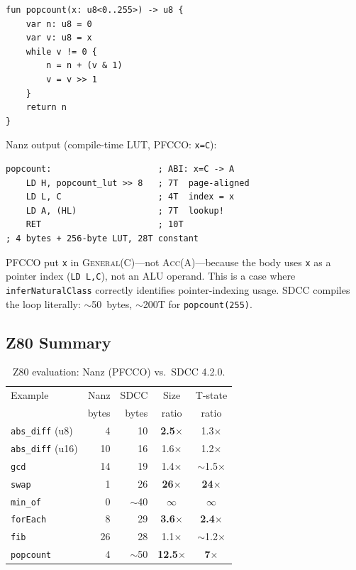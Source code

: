 \documentclass[sigplan,screen,nonacm]{acmart}
\begin{document}
\begin{lstlisting}[language=nanz,caption={Popcount with range annotation.}]
fun popcount(x: u8<0..255>) -> u8 {
    var n: u8 = 0
    var v: u8 = x
    while v != 0 {
        n = n + (v & 1)
        v = v >> 1
    }
    return n
}
\end{lstlisting}

\noindent Nanz output (compile-time LUT, PFCCO: \texttt{x=C}):
\begin{lstlisting}[language=z80asm]
popcount:                     ; ABI: x=C -> A
    LD H, popcount_lut >> 8   ; 7T  page-aligned
    LD L, C                   ; 4T  index = x
    LD A, (HL)                ; 7T  lookup!
    RET                       ; 10T
; 4 bytes + 256-byte LUT, 28T constant
\end{lstlisting}

PFCCO put \texttt{x} in \textsc{General}(C)---not \textsc{Acc}(A)---because
the body uses \texttt{x} as a pointer index (\texttt{LD~L,C}), not an ALU
operand.  This is a case where \texttt{inferNaturalClass} correctly
identifies pointer-indexing usage.  SDCC compiles the loop literally: $\sim$50~bytes, $\sim$200T for \texttt{popcount(255)}.

\subsection{Z80 Summary}

\begin{table}[h]
\centering\small
\caption{Z80 evaluation: Nanz (PFCCO) vs.\ SDCC 4.2.0.}
\label{tab:z80summary}
\begin{tabular}{@{}lrrcc@{}}
\toprule
Example & Nanz & SDCC & Size & T-state \\
        & bytes & bytes & ratio & ratio \\
\midrule
\texttt{abs\_diff} (u8)  & 4  & 10 & \textbf{2.5$\times$} & 1.3$\times$ \\
\texttt{abs\_diff} (u16) & 10 & 16 & 1.6$\times$ & 1.2$\times$ \\
\texttt{gcd}             & 14 & 19 & 1.4$\times$ & $\sim$1.5$\times$ \\
\texttt{swap}            & 1  & 26 & \textbf{26$\times$}  & \textbf{24$\times$} \\
\texttt{min\_of}         & 0  & $\sim$40 & \textbf{$\infty$} & \textbf{$\infty$} \\
\texttt{forEach}         & 8  & 29 & \textbf{3.6$\times$} & \textbf{2.4$\times$} \\
\texttt{fib}             & 26 & 28 & 1.1$\times$ & $\sim$1.2$\times$ \\
\texttt{popcount}        & 4  & $\sim$50 & \textbf{12.5$\times$} & \textbf{7$\times$} \\
\bottomrule
\end{tabular}
\end{table}
\end{document}
